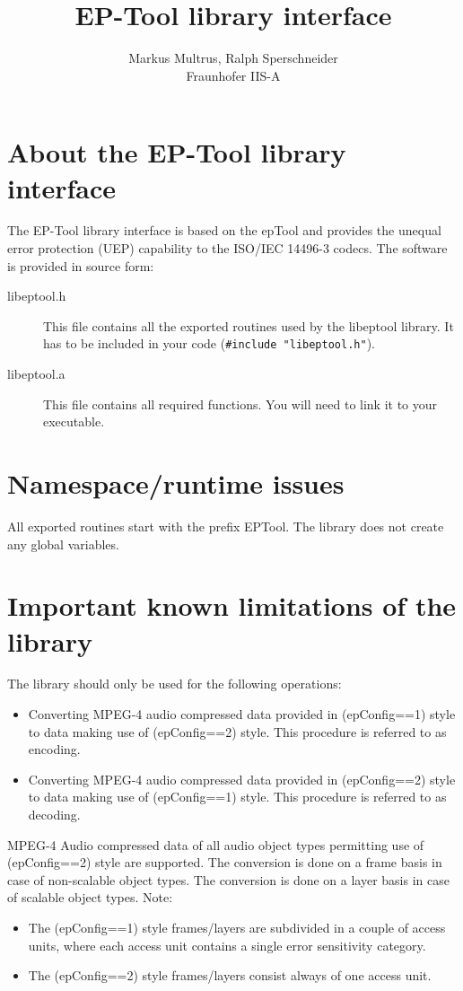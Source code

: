 \documentclass[a4paper]{article}
\begin{document}
\title{EP-Tool library interface}
\author{Markus Multrus, Ralph Sperschneider\\
  Fraunhofer IIS-A}
\maketitle

\section{About the EP-Tool library interface}
The EP-Tool library interface is based on the epTool and provides the
unequal error protection (UEP) capability to the ISO/IEC 14496-3
codecs. The software is provided in source form: 
\begin{description}
\item[libeptool.h] This file contains all the exported routines used by
  the libeptool library. It has to be included in your
  code (\verb?#include "libeptool.h"?).
\item[libeptool.a] This file contains all required functions. You will
  need to link it to your executable.
\end{description}

\section{Namespace/runtime issues}
All exported routines start with the prefix EPTool. The library
does not create any global variables.

\section{Important known limitations of the library}
The library should only be used for the following operations:
\begin{itemize}
\item Converting MPEG-4 audio compressed data provided in
  (epConfig==1) style to data making use of (epConfig==2) style. This
  procedure is referred to as encoding.
\item  Converting MPEG-4 audio compressed data provided in
  (epConfig==2) style to data making use of (epConfig==1) style. This
  procedure is referred to as decoding.
\end{itemize}

MPEG-4 Audio compressed data of all audio object types permitting use of
(epConfig==2) style are supported. The conversion is done on a frame
basis in case of non-scalable object types. The conversion is done on a
layer basis in case of scalable object types. Note:
\begin{itemize}
\item The (epConfig==1) style frames/layers are subdivided in a couple
  of access units, where each access unit contains a single error
  sensitivity category.
\item The (epConfig==2) style frames/layers consist always of one access
  unit.
\end{itemize}
\end{document}

